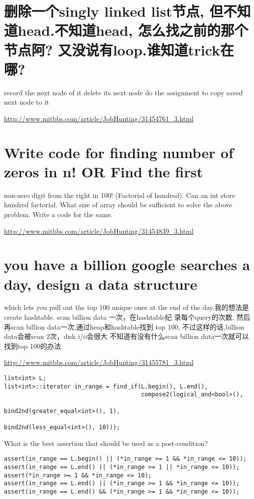 \documentclass[12pt]{book}
\begin{document}
\section{删除一个singly linked list节点, 但不知道head.不知道head, 怎么找之前的那个节点阿? 又没说有loop.谁知道trick在哪?}
\label{sec-14-1}

record the next node of it delete its next node do the assignment to copy saved next node to it 

\url{http://www.mitbbs.com/article/JobHunting/31454761_3.html}

\section{Write code for finding number of zeros in n! OR Find the first}
\label{sec-14-2}
non-zero digit from the right in 100! (Factorial of hundred). Can an
int store hundred factorial. What size of array should be sufficient to solve the above problem. Write a code for the same.

\url{http://www.mitbbs.com/article/JobHunting/31454839_3.html}

\section{you have a billion google searches a day, design a data structure}
\label{sec-14-3}
which lets you pull out the top 100 unique ones at the end of the
day.我的想法是create hashtable. scan billion data 一次，在hashtable纪
录每个query的次数, 然后再scan billion data一次,通过heap和hashtable找到
top 100, 不过这样的话,billion data会被scan 2次，disk i/o会很大
不知道有没有什么scan billion data一次就可以找到top 100的办法

\url{http://www.mitbbs.com/article/JobHunting/31455781_3.html}

\lstset{language=java,label= ,caption= ,numbers=none}
\begin{lstlisting}
list<int> L;
list<int>::iterator in_range = find_if(L.begin(), L.end(),
                                       compose2(logical_and<bool>(),
                                                bind2nd(greater_equal<int>(), 1),
                                                bind2nd(less_equal<int>(), 10)));
\end{lstlisting}
What is the best assertion that should be used as a post-condition?
\lstset{language=java,label= ,caption= ,numbers=none}
\begin{lstlisting}
assert(in_range == L.begin() || (*in_range >= 1 && *in_range <= 10));
assert(in_range == L.end() || (*in_range >= 1 || *in_range <= 10));
assert(*in_range >= 1 && *in_range <= 10);
assert(in_range == L.end() || (*in_range >= 1 && *in_range <= 10));
assert(in_range == L.end() && (*in_range >= 1 && *in_range <= 10));
\end{lstlisting}
\end{document}
